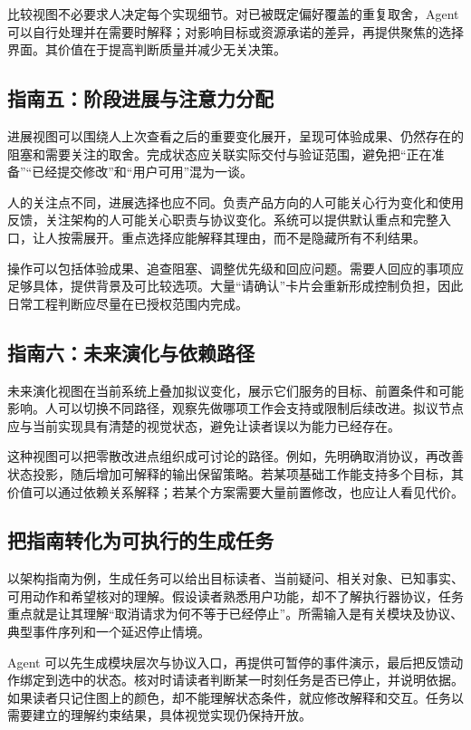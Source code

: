 比较视图不必要求人决定每个实现细节。对已被既定偏好覆盖的重复取舍，Agent 可以自行处理并在需要时解释；对影响目标或资源承诺的差异，再提供聚焦的选择界面。其价值在于提高判断质量并减少无关决策。

\subsection{指南五：阶段进展与注意力分配}
进展视图可以围绕人上次查看之后的重要变化展开，呈现可体验成果、仍然存在的阻塞和需要关注的取舍。完成状态应关联实际交付与验证范围，避免把“正在准备”“已经提交修改”和“用户可用”混为一谈。

人的关注点不同，进展选择也应不同。负责产品方向的人可能关心行为变化和使用反馈，关注架构的人可能关心职责与协议变化。系统可以提供默认重点和完整入口，让人按需展开。重点选择应能解释其理由，而不是隐藏所有不利结果。

操作可以包括体验成果、追查阻塞、调整优先级和回应问题。需要人回应的事项应足够具体，提供背景及可比较选项。大量“请确认”卡片会重新形成控制负担，因此日常工程判断应尽量在已授权范围内完成。

\subsection{指南六：未来演化与依赖路径}
未来演化视图在当前系统上叠加拟议变化，展示它们服务的目标、前置条件和可能影响。人可以切换不同路径，观察先做哪项工作会支持或限制后续改进。拟议节点应与当前实现具有清楚的视觉状态，避免让读者误以为能力已经存在。

这种视图可以把零散改进点组织成可讨论的路径。例如，先明确取消协议，再改善状态投影，随后增加可解释的输出保留策略。若某项基础工作能支持多个目标，其价值可以通过依赖关系解释；若某个方案需要大量前置修改，也应让人看见代价。


\subsection{把指南转化为可执行的生成任务}
以架构指南为例，生成任务可以给出目标读者、当前疑问、相关对象、已知事实、可用动作和希望核对的理解。假设读者熟悉用户功能，却不了解执行器协议，任务重点就是让其理解“取消请求为何不等于已经停止”。所需输入是有关模块及协议、典型事件序列和一个延迟停止情境。

Agent 可以先生成模块层次与协议入口，再提供可暂停的事件演示，最后把反馈动作绑定到选中的状态。核对时请读者判断某一时刻任务是否已停止，并说明依据。如果读者只记住图上的颜色，却不能理解状态条件，就应修改解释和交互。任务以需要建立的理解约束结果，具体视觉实现仍保持开放。

